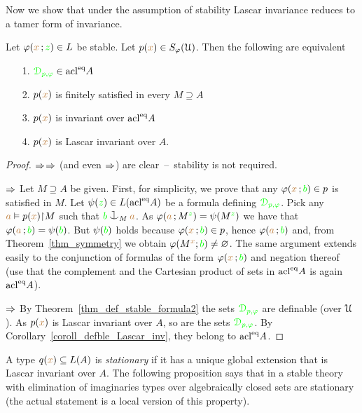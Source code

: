 Now we show that under the assumption of stability Lascar invariance reduces to a tamer form of invariance.

\begin{proposition}\label{prop_type_over_acl2}
  Let $\varphi({\color{brown} x}\,;{\color{green} z})\in L$ be stable.
  Let $p({\color{brown} x})\in S_\varphi(\EuScript U)$. 
  Then the following are equivalent
  \begin{itemize}
  \item[1.] ${\color{green}\EuScript D_{p,\varphi}}\in \mathop{\rm acl}^{{\rm eq}}\!A$
  \item[2.] $p({\color{brown} x})$ is finitely satisfied in every $M\supseteq A$
  \item[3.] $p({\color{brown} x})$ is invariant over $\mathop{\rm acl}^{{\rm eq}}\!A$
  \item[4.] $p({\color{brown} x})$ is Lascar invariant over $A$.
  \end{itemize}
\end{proposition}
\begin{proof}
  $\Rightarrow$$\Rightarrow$ (and even $\Rightarrow$) are clear~--~stability is not required.

  $\Rightarrow$
  Let $M\supseteq A$ be given.
  First, for simplicity, we prove that any $\varphi({\color{brown} x}\,;{\color{green} b})\in p$ is satisfied in $M$.
  Let $\psi({\color{green} z})\in L(\mathop{\rm acl}^{{\rm eq}}\!A)$ be a formula defining ${\color{green}\EuScript D_{p,\varphi}}$.
  Pick any ${\color{brown} a}\vDash p({\color{brown} x}){\restriction} M$ such that ${\gr b}\cnonfork_M{\mr a}$.
  As $\varphi({\color{brown} a}\,;M^{\color{green} z})=\psi(M^{\color{green} z})$ we have that $\varphi({\color{brown} a}\,;{\color{green} b})=\psi({\color{green} b})$.
  But $\psi({\color{green} b})$ holds because $\varphi({\color{brown} x}\,;{\color{green} b})\in p$, hence $\varphi({\color{brown} a}\,;{\color{green} b})$ and, from Theorem~\ref{thm_symmetry} we obtain $\varphi(M^{\color{brown} x};{\color{green} b})\neq\varnothing$.
  The same argument extends easily to the conjunction of formulas of the form $\varphi({\color{brown} x}\,;{\color{green} b})$ and negation thereof (use that the complement and the Cartesian product of sets in $\mathop{\rm acl}^{{\rm eq}}\!A$ is again $\mathop{\rm acl}^{{\rm eq}}\!A$).
 
  $\Rightarrow$ By Theorem~\ref{thm_def_stable_formula2} the sets ${\color{green}\EuScript D_{p,\varphi}}$ are definable (over $\EuScript U$).
  As $p({\color{brown} x})$ is Lascar invariant over $A$, so are the sets ${\color{green}\EuScript D_{p,\varphi}}$.
  By Corollary~\ref{coroll_defble_Lascar_inv}, they belong to $\mathop{\rm acl}^{{\rm eq}}\!A$.
\end{proof}

A type $q({\color{brown} x})\subseteq L(A)$ is \emph{stationary\/} if it has a unique global extension that is Lascar invariant over $A$.
The following proposition says that in a stable theory with elimination of imaginaries types over algebraically closed sets are stationary (the actual statement is a local version of this property).

